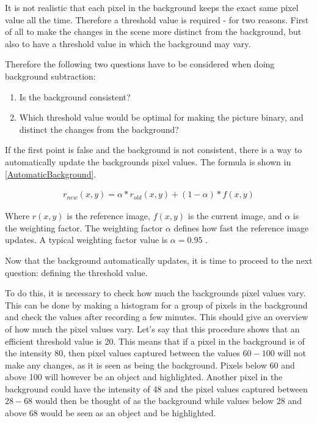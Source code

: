 {It is not realistic that each pixel in the background keeps the exact same pixel value all the time. Therefore a threshold value is required - for two reasons. First of all to make the changes in the scene more distinct from the background, but also to have a threshold value in which the background may vary.

Therefore the following two questions have to be considered when doing background subtraction:
\begin{enumerate} 
	\item Is the background consistent? 
	\item Which threshold value would be optimal for making the picture binary, and distinct the changes from the background? 
\end{enumerate}

If the first point is false and the background is not consistent, there is a way to automatically update the backgrounds pixel values. The formula is shown in \ref{AutomaticBackground}.

\begin{equation}
	\begin{aligned}
  		r_{new}(x,y)=\alpha*r_{old}(x,y)+(1-\alpha)*f(x,y)
		\label{AutomaticBackground}  
 	\end{aligned}
\end{equation}  

Where $r(x,y)$ is the reference image, $f(x,y)$ is the current image, and $\alpha$ is the weighting factor. The weighting factor $\alpha$ defines how fast the reference image updates. A typical weighting factor value is  $\alpha = 0.95$ \citep{ip_book}.

Now that the background automatically updates, it is time to proceed to the next question: defining the threshold value.

To do this, it is necessary to check how much the backgrounds pixel values vary. This can be done by making a histogram for a group of pixels in the background and check the values after recording a few minutes. This should give an overview of how much the pixel values vary. Let's say that this procedure shows that an efficient threshold value is 20. This means that if a pixel in the background is of the intensity 80, then pixel values captured between the values $60-100$ will not make any changes, as it is seen as being the background. Pixels below 60 and above 100 will however be an object and highlighted. Another pixel in the background could have the intensity of 48 and the pixel values captured between $28-68$ would then be thought of as the background while values below 28 and above 68 would be seen as an object and be highlighted.

}
